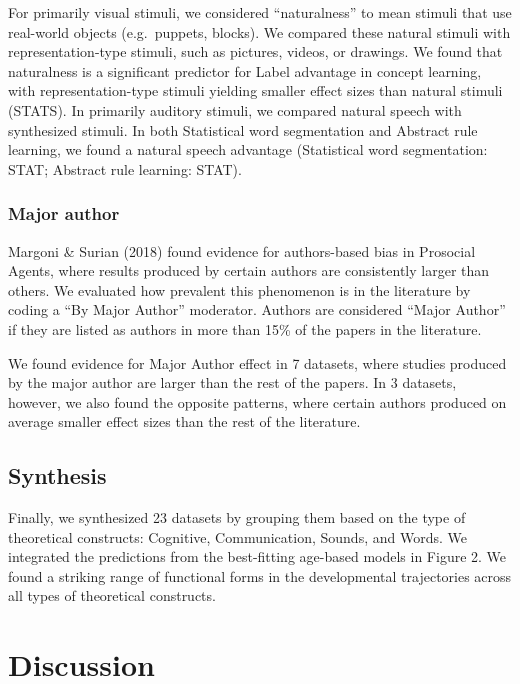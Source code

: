 \documentclass[10pt, letterpaper]{article}
\begin{document}
For primarily visual stimuli, we considered ``naturalness'' to mean
stimuli that use real-world objects (e.g.~puppets, blocks). We compared
these natural stimuli with representation-type stimuli, such as
pictures, videos, or drawings. We found that naturalness is a
significant predictor for Label advantage in concept learning, with
representation-type stimuli yielding smaller effect sizes than natural
stimuli (STATS). In primarily auditory stimuli, we compared natural
speech with synthesized stimuli. In both Statistical word segmentation
and Abstract rule learning, we found a natural speech advantage
(Statistical word segmentation: STAT; Abstract rule learning: STAT).

\hypertarget{major-author}{%
\subsubsection{Major author}\label{major-author}}

Margoni \& Surian (2018) found evidence for authors-based bias in
Prosocial Agents, where results produced by certain authors are
consistently larger than others. We evaluated how prevalent this
phenomenon is in the literature by coding a ``By Major Author''
moderator. Authors are considered ``Major Author'' if they are listed as
authors in more than 15\% of the papers in the literature.

We found evidence for Major Author effect in 7 datasets, where studies
produced by the major author are larger than the rest of the papers. In
3 datasets, however, we also found the opposite patterns, where certain
authors produced on average smaller effect sizes than the rest of the
literature.

\hypertarget{synthesis}{%
\subsection{Synthesis}\label{synthesis}}

Finally, we synthesized 23 datasets by grouping them based on the type
of theoretical constructs: Cognitive, Communication, Sounds, and Words.
We integrated the predictions from the best-fitting age-based models in
Figure 2. We found a striking range of functional forms in the
developmental trajectories across all types of theoretical constructs.

\hypertarget{discussion}{%
\section{Discussion}\label{discussion}}
\end{document}
